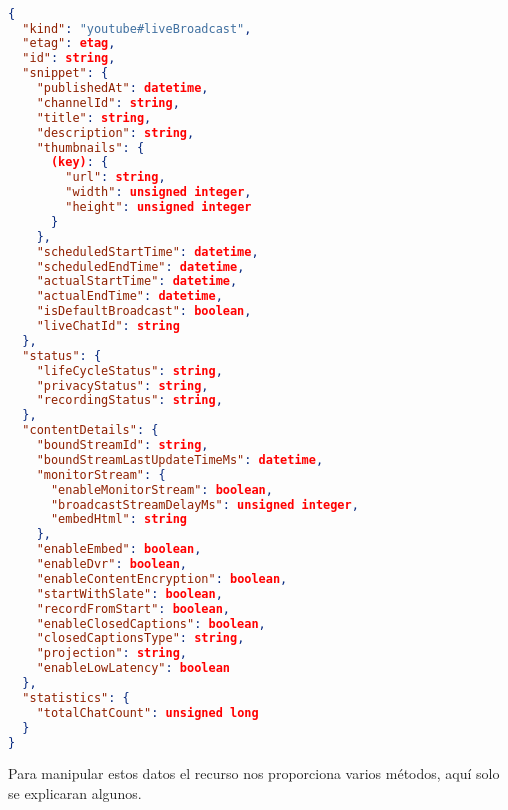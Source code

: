 \begin{lstlisting}[language=JSON] 

{
  "kind": "youtube#liveBroadcast",
  "etag": etag,
  "id": string,
  "snippet": {
    "publishedAt": datetime,
    "channelId": string,
    "title": string,
    "description": string,
    "thumbnails": {
      (key): {
        "url": string,
        "width": unsigned integer,
        "height": unsigned integer
      }
    },
    "scheduledStartTime": datetime,
    "scheduledEndTime": datetime,
    "actualStartTime": datetime,
    "actualEndTime": datetime,
    "isDefaultBroadcast": boolean,
    "liveChatId": string
  },
  "status": {
    "lifeCycleStatus": string,
    "privacyStatus": string,
    "recordingStatus": string,
  },
  "contentDetails": {
    "boundStreamId": string,
    "boundStreamLastUpdateTimeMs": datetime,
    "monitorStream": {
      "enableMonitorStream": boolean,
      "broadcastStreamDelayMs": unsigned integer,
      "embedHtml": string
    },
    "enableEmbed": boolean,
    "enableDvr": boolean,
    "enableContentEncryption": boolean,
    "startWithSlate": boolean,
    "recordFromStart": boolean,
    "enableClosedCaptions": boolean,
    "closedCaptionsType": string,
    "projection": string,
    "enableLowLatency": boolean
  },
  "statistics": {
    "totalChatCount": unsigned long
  }
}

\end{lstlisting}

Para manipular estos datos el recurso nos proporciona varios métodos, aquí solo se explicaran algunos.

